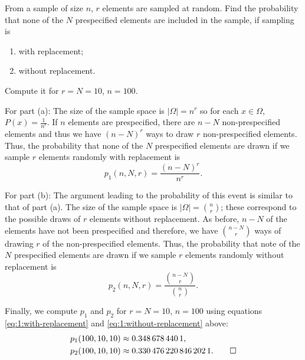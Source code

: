 \begin{problem}[Handout 1, \# 9]
  From a sample of size \(n\), \(r\) elements are sampled at random. Find
  the probability that none of the \(N\) prespecified elements are included
  in the sample, if sampling is
  \begin{enumerate}[label=(\alph*),noitemsep]
  \item with replacement;
  \item without replacement.
  \end{enumerate}
  Compute it for \(r=N=10\), \(n=100\).
\end{problem}
\begin{solution*}
  For part (a): The size of the sample space is \(|\Omega|=n^r\) so for
  each \(x\in\Omega\), \(P(x)=\frac{1}{n^r}\). If \(n\) elements are
  prespecified, there are \(n-N\) non-prespecified elements and thus we
  have \((n-N)^r\) ways to draw \(r\) non-prespecified elements. Thus, the
  probability that none of the \(N\) prespecified elements are drawn if we
  sample \(r\) elements randomly with replacement is
  \begin{equation}
    \label{eq:1:with-replacement}
    p_1(n,N,r)=\frac{(n-N)^r}{n^r}.
  \end{equation}

  For part (b): The argument leading to the probability of this event is
  similar to that of part (a). The size of the sample space is
  \(|\Omega|=\binom{n}{r}\); these correspond to the possible draws of
  \(r\) elements without replacement. As before, \(n-N\) of the elements
  have not been prespecified and therefore, we have \(\binom{n-N}{r}\) ways
  of drawing \(r\) of the non-prespecified elements. Thus, the probability
  that note of the \(N\) prespecified elements are drawn if we sample \(r\)
  elements randomly without replacement is
  \begin{equation}
    \label{eq:1:without-replacement}
    p_2(n,N,r)=\frac{\binom{n-N}{r}}{\binom{n}{r}}.
  \end{equation}

  Finally, we compute \(p_1\) and \(p_2\) for \(r=N=10\), \(n=100\) using
  equations \eqref{eq:1:with-replacement} and
  \eqref{eq:1:without-replacement} above:
  \begin{align*}
    p_1(100,10,10)&\approx\num{0.3486784401},\\
    p_2(100,10,10)&\approx\num{0.3304762208462021}.\qedhere
  \end{align*}
\end{solution*}

